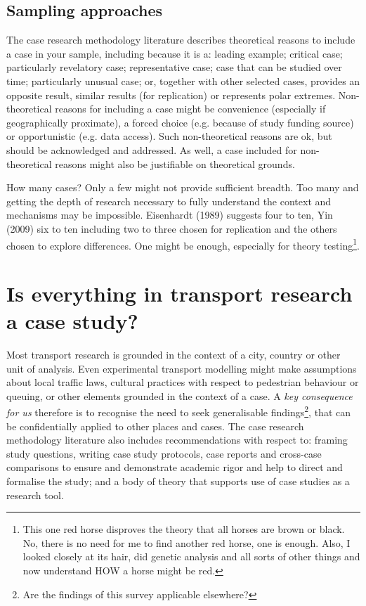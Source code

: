 \documentclass{tufte-handout}
\begin{document}
\subsection{Sampling approaches}
The case research methodology literature describes theoretical reasons to include a case in your sample, including because it is a: leading example; critical case; particularly revelatory case; representative case; case that can be studied over time; particularly unusual case; or, together with other selected cases, provides an opposite result, similar results (for replication) or represents polar extremes. Non-theoretical reasons for including a case might be convenience (especially if geographically proximate), a forced choice (e.g. because of study funding source) or opportunistic (e.g. data access)\cite{Eisenhardt1989aa, Meredith1998aa, Stuart2002aa, Voss2002aa,}. Such non-theoretical reasons are ok, but should be acknowledged and addressed.  As well, a case included for non-theoretical reasons might also be justifiable on theoretical grounds.  

How many cases?  Only a few might not provide sufficient breadth.  Too many and getting the depth of research necessary to fully understand the context and mechanisms may be impossible. Eisenhardt (1989) suggests four to ten, Yin (2009) six to ten including two to three  chosen for replication and the others chosen to explore differences. One might be enough, especially for theory testing\footnote{This one red horse disproves the theory that all horses are brown or black.  No, there is no need for me to find another red horse, one is enough. Also, I looked closely at its hair, did genetic analysis and all sorts of other things and now understand HOW a horse might be red.}.


\section{Is everything in transport research a case study?}
Most transport research is grounded in the context of a city, country or other unit of analysis. Even experimental transport modelling might make assumptions about local traffic laws, cultural practices with respect to pedestrian behaviour or queuing, or other elements grounded in the context of a case.  A \emph{key consequence for us} therefore is to recognise the need to seek generalisable findings\footnote{Are the findings of this survey applicable elsewhere?}, that can be confidentially applied to other places and cases.  The case research methodology literature also includes recommendations with respect to: framing study questions, writing case study protocols, case reports and cross-case comparisons to ensure and demonstrate academic rigor and help to direct and formalise the study; and a body of theory that supports use of case studies as a research tool.  



\end{document}

